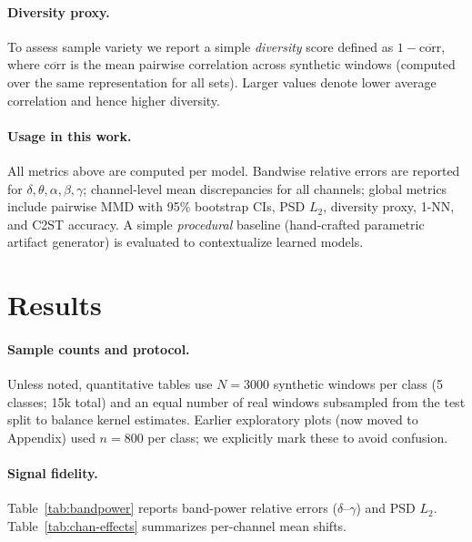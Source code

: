 \documentclass{article}
\begin{document}
\paragraph{Diversity proxy.}
To assess sample variety we report a simple \emph{diversity} score defined as $1 - \overline{\mathrm{corr}}$, where $\overline{\mathrm{corr}}$ is the mean pairwise correlation across synthetic windows (computed over the same representation for all sets). Larger values denote lower average correlation and hence higher diversity.

\paragraph{Usage in this work.} All metrics above are computed per model. Bandwise relative errors are reported for $\delta,\theta,\alpha,\beta,\gamma$; channel-level mean discrepancies for all channels; global metrics include pairwise $\mathrm{MMD}$ with 95\% bootstrap CIs, PSD $L_2$, diversity proxy, 1-NN, and C2ST accuracy. A simple \emph{procedural} baseline (hand-crafted parametric artifact generator) is evaluated to contextualize learned models.

\section{Results}
\label{sec:results}
\paragraph{Sample counts and protocol.} Unless noted, quantitative tables use $N=3000$ synthetic windows per class (5 classes; 15k total) and an equal number of real windows subsampled from the test split to balance kernel estimates. Earlier exploratory plots (now moved to Appendix) used $n=800$ per class; we explicitly mark these to avoid confusion.

\paragraph{Signal fidelity.} Table~\ref{tab:bandpower} reports band-power relative errors ($\delta$--$\gamma$) and PSD $L_2$. Table~\ref{tab:chan-effects} summarizes per-channel mean shifts.

\begin{table}[t]
  \centering
  \caption{Band-power relative errors (lower is better) and PSD $L_2$ (auto-generated).}
  \label{tab:bandpower}
  
\end{table}
\end{document}
